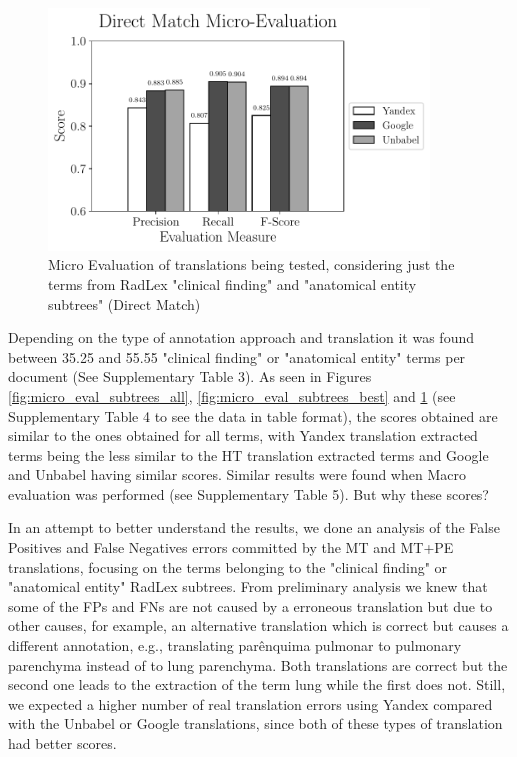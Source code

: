 \begin{figure}
	\centering
	\includegraphics[width=0.9\textwidth]{SupportFiles/plots/direct_match_micro_clinical_anatomical_subtrees_plot.pdf}
	\caption{Micro Evaluation of translations being tested, considering just the terms from RadLex "clinical finding" and "anatomical entity subtrees" (Direct Match)}
	\label{fig:micro_eval_subtrees_direct}
\end{figure}

Depending on the type of annotation approach and translation it was found between 35.25 and 55.55 "clinical finding" or "anatomical entity" terms per document (See Supplementary Table 3). As seen in Figures \ref{fig:micro_eval_subtrees_all}, \ref{fig:micro_eval_subtrees_best} and \ref{fig:micro_eval_subtrees_direct} (see Supplementary Table 4 to see the data in table format), the scores obtained are similar to the ones obtained for all terms, with Yandex translation extracted terms being the less similar to the HT translation extracted terms and Google and Unbabel having similar scores. Similar results were found when Macro evaluation was performed (see Supplementary Table 5). But why these scores? 

In an attempt to better understand the results, we done an analysis of the False Positives and False Negatives errors committed by the MT and MT+PE translations, focusing on the terms belonging to the "clinical finding" or "anatomical entity" RadLex subtrees. From preliminary analysis we knew that some of the FPs and FNs are not caused by a erroneous translation but due to other causes, for example, an alternative translation which is correct but causes a different annotation, e.g., translating parênquima pulmonar to pulmonary parenchyma instead of to lung parenchyma. Both translations are correct but the second one leads to the extraction of the term lung while the first does not. Still, we expected a higher number of real translation errors using Yandex compared with the Unbabel or Google translations, since both of these types of translation had better scores.

